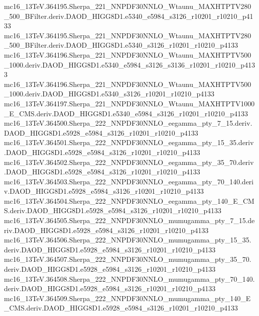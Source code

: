 \begin{footnotesize}
mc16\_13TeV.364195.Sherpa\_221\_NNPDF30NNLO\_Wtaunu\_MAXHTPTV280\_500\_BFilter.deriv.DAOD\_HIGG8D1.e5340\_e5984\_s3126\_r10201\_r10210\_p4133 \\
mc16\_13TeV.364195.Sherpa\_221\_NNPDF30NNLO\_Wtaunu\_MAXHTPTV280\_500\_BFilter.deriv.DAOD\_HIGG8D1.e5340\_s3126\_r10201\_r10210\_p4133 \\
mc16\_13TeV.364196.Sherpa\_221\_NNPDF30NNLO\_Wtaunu\_MAXHTPTV500\_1000.deriv.DAOD\_HIGG8D1.e5340\_e5984\_s3126\_s3136\_r10201\_r10210\_p4133 \\
mc16\_13TeV.364196.Sherpa\_221\_NNPDF30NNLO\_Wtaunu\_MAXHTPTV500\_1000.deriv.DAOD\_HIGG8D1.e5340\_s3126\_r10201\_r10210\_p4133 \\
mc16\_13TeV.364197.Sherpa\_221\_NNPDF30NNLO\_Wtaunu\_MAXHTPTV1000\_E\_CMS.deriv.DAOD\_HIGG8D1.e5340\_e5984\_s3126\_r10201\_r10210\_p4133 \\
mc16\_13TeV.364500.Sherpa\_222\_NNPDF30NNLO\_eegamma\_pty\_7\_15.deriv.DAOD\_HIGG8D1.e5928\_e5984\_s3126\_r10201\_r10210\_p4133 \\
mc16\_13TeV.364501.Sherpa\_222\_NNPDF30NNLO\_eegamma\_pty\_15\_35.deriv.DAOD\_HIGG8D1.e5928\_e5984\_s3126\_r10201\_r10210\_p4133 \\
mc16\_13TeV.364502.Sherpa\_222\_NNPDF30NNLO\_eegamma\_pty\_35\_70.deriv.DAOD\_HIGG8D1.e5928\_e5984\_s3126\_r10201\_r10210\_p4133 \\
mc16\_13TeV.364503.Sherpa\_222\_NNPDF30NNLO\_eegamma\_pty\_70\_140.deriv.DAOD\_HIGG8D1.e5928\_e5984\_s3126\_r10201\_r10210\_p4133 \\
mc16\_13TeV.364504.Sherpa\_222\_NNPDF30NNLO\_eegamma\_pty\_140\_E\_CMS.deriv.DAOD\_HIGG8D1.e5928\_e5984\_s3126\_r10201\_r10210\_p4133 \\
mc16\_13TeV.364505.Sherpa\_222\_NNPDF30NNLO\_mumugamma\_pty\_7\_15.deriv.DAOD\_HIGG8D1.e5928\_e5984\_s3126\_r10201\_r10210\_p4133 \\
mc16\_13TeV.364506.Sherpa\_222\_NNPDF30NNLO\_mumugamma\_pty\_15\_35.deriv.DAOD\_HIGG8D1.e5928\_e5984\_s3126\_r10201\_r10210\_p4133 \\
mc16\_13TeV.364507.Sherpa\_222\_NNPDF30NNLO\_mumugamma\_pty\_35\_70.deriv.DAOD\_HIGG8D1.e5928\_e5984\_s3126\_r10201\_r10210\_p4133 \\
mc16\_13TeV.364508.Sherpa\_222\_NNPDF30NNLO\_mumugamma\_pty\_70\_140.deriv.DAOD\_HIGG8D1.e5928\_e5984\_s3126\_r10201\_r10210\_p4133 \\
mc16\_13TeV.364509.Sherpa\_222\_NNPDF30NNLO\_mumugamma\_pty\_140\_E\_CMS.deriv.DAOD\_HIGG8D1.e5928\_e5984\_s3126\_r10201\_r10210\_p4133 \\

\end{footnotesize}
